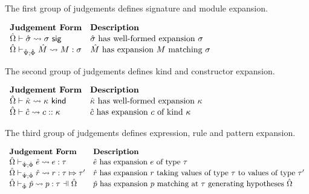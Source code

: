 The first group of judgements defines signature and module expansion.

\vspace{10px}
$\begin{array}{ll}
\textbf{Judgement Form} & \textbf{Description}\\
{\hat\Omega} \vdash {\hat\sigma} \leadsto \sigma~\mathsf{sig} & \text{${\hat\sigma}$ has well-formed expansion $\sigma$}\\
{\hat\Omega} \vdash_{\hat{\Psi}; \hat\Phi} {\hat M} \leadsto M : \sigma & \text{${\hat M}$ has expansion $M$ matching $\sigma$}
\end{array}$
\vspace{10px}

The second group of judgements defines kind and constructor expansion.

\vspace{10px}
$\begin{array}{ll}
\textbf{Judgement Form} & \textbf{Description}\\
{\hat\Omega} \vdash {\hat\kappa} \leadsto \kappa~\mathsf{kind} & \text{${\hat\kappa}$ has well-formed expansion $\kappa$}\\
{\hat\Omega} \vdash {\hat c} \leadsto c :: \kappa & \text{${\hat c}$ has expansion $c$ of kind $\kappa$}
\end{array}$
\vspace{10px}

The third group of judgements defines expression, rule and pattern expansion.

\vspace{10px}
$\begin{array}{ll}
\textbf{Judgement Form} & \textbf{Description}\\
\expandsPX{\ue}{e}{\tau} & \text{$\ue$ has expansion $e$ of type $\tau$}\\
\rExpandsSP{\uOmega}{\uPsi}{\uPhi}{\urv}{r}{\tau}{\tau'} & \text{$\urv$ has expansion $r$ taking values of type $\tau$ to values of type $\tau'$}\\
\patExpandsP{\uOmega}{\uPhi}{\upv}{p}{\tau} & \text{$\upv$ has expansion $p$ matching at $\tau$  generating hypotheses $\uOmega$}
\end{array}$
\vspace{10px}
 
